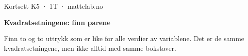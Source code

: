 \documentclass[11pt,a4paper]{article}
\begin{document}
\begin{minipage}[t]{0.8\linewidth}\vspace{0pt}
{\sffamily\small\color{dempet}Kortsett K5 · 1T · mattelab.no}\par\vspace{0.25em}
{\fontsize{20}{24}\selectfont\bfseries Kvadratsetningene: finn parene}\par\vspace{0.5em}
Finn to og to uttrykk som er like for alle verdier av variablene. Det er de samme kvadratsetningene, men ikke alltid med samme bokstaver.\par{}
\end{minipage}\hfill
\begin{minipage}[t]{0.15\linewidth}\vspace{0pt}\raggedleft
{}
\end{minipage}\par\vspace{0.8em}
\end{document}

